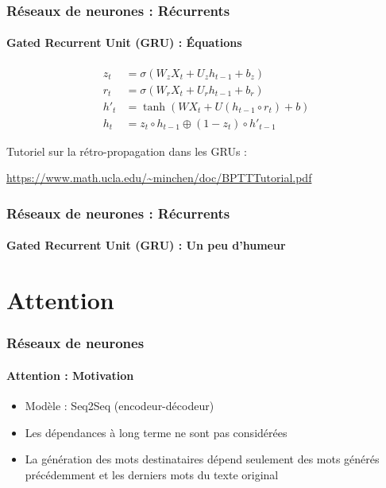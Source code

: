 \documentclass[xcolor=table]{beamer}
\begin{document}
\begin{frame}
	\frametitle{Réseaux de neurones : Récurrents}
	\framesubtitle{Gated Recurrent Unit (GRU) : \'Equations}
	
	{\huge\vskip-24pt
	\begin{align*}
	z_t &= \sigma(W_z X_t + U_z h_{t-1} + b_z) \\
	r_t &= \sigma(W_r X_t + U_r h_{t-1} + b_r) \\
	h'_t &= \tanh(W X_t + U (h_{t-1} \circ r_t) + b) \\
	h_t &= z_t \circ h_{t-1} \oplus (1-z_t) \circ h'_{t-1}
	\end{align*}
	}
	
	\vskip12pt
	Tutoriel sur la rétro-propagation dans les GRUs :
	
	\url{https://www.math.ucla.edu/~minchen/doc/BPTTTutorial.pdf}
	
\end{frame}

\begin{frame}
	\frametitle{Réseaux de neurones : Récurrents}
	\framesubtitle{Gated Recurrent Unit (GRU) : Un peu d'humeur}
	
	\begin{center}
	\end{center}
	
\end{frame}


\section{Attention}

\begin{frame}
	\frametitle{Réseaux de neurones}
	\framesubtitle{Attention : Motivation}
	
	\begin{center}
	\end{center}

\begin{itemize}
	\item Modèle : Seq2Seq (encodeur-décodeur)
	\item Les dépendances à long terme ne sont pas considérées
	\item La génération des mots destinataires dépend seulement des mots générés précédemment et les derniers mots du texte original
\end{itemize}
	
\end{frame}
\end{document}
